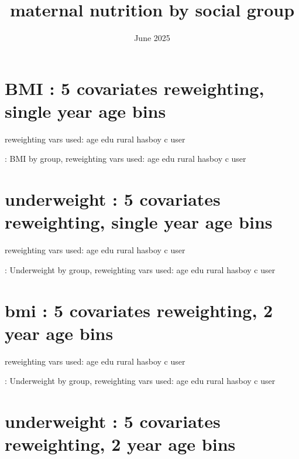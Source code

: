 \documentclass{article}
\title{maternal nutrition by social group}
\date{June 2025}
\begin{document}
\maketitle


\section{BMI : 5 covariates reweighting, single year age bins }

reweighting vars used: age edu rural hasboy c user

\begin{table}[H]
    \centering
    \footnotesize %
    \caption{: BMI by group, reweighting vars used: age edu rural hasboy c user}
    \label{tab:sumstat}
\end{table}


\section{underweight : 5 covariates reweighting, single year age bins }

reweighting vars used: age edu rural hasboy c user

\begin{table}[H]
    \centering
    \footnotesize %
    \caption{: Underweight by group, reweighting vars used: age edu rural hasboy c user}
    \label{tab:sumstat}
\end{table}


\section{bmi : 5 covariates reweighting, 2 year age bins }

reweighting vars used: age edu rural hasboy c user

\begin{table}[H]
    \centering
    \footnotesize %
    \caption{: Underweight by group, reweighting vars used: age edu rural hasboy c user}
    \label{tab:sumstat}
\end{table}


\section{underweight : 5 covariates reweighting, 2 year age bins }
\end{document}
